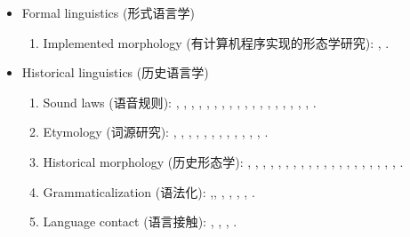 \documentclass[oneside,a4paper,11pt]{article}
\newcommand{\zh}[1]{{\cn #1}}
\newcommand{\lingua}[3]{#1 (\zh{#3})}
\begin{document}
\begin{itemize}
\begin{itemize}
\item \lingua{Formal linguistics}{Linguistique formelle}{形式语言学}
\begin{enumerate}
\item \lingua{Implemented morphology}{Morphologie implémentée}{有计算机程序实现的形态学研究}: \cite{walther14inv.canon}, \cite{walther14compactness}.
\end{enumerate}

\item \lingua{Historical linguistics}{Linguistique historique}{历史语言学}
\begin{enumerate}
\item \lingua{Sound laws}{Lois phonétiques}{语音规则}:  \cite{jacques00ywij}, \cite{jacques01dg}, \cite{jacques03dissimilation},   \cite{jacques04thimphu}, \cite{jacques06comparaison}, \cite{jacques09wazur}, \cite{jacques09e}, \cite{michaud10bonin}, \cite{jacques10ndr}, \cite{jacques.michaud11naish},   \cite{rg-gj12yod}, \cite{jacques13arapaho}, \cite{jacques13yod}, \cite{jacques14snom},   \cite{jacques14esquisse}, \cite{jacques14cone}, \cite{jacques16ebde}, \cite{jacques16tonogenesis}, \cite{jacques17pkiranti}.
\item  \lingua{Etymology}{Etymologie}{词源研究}:    \cite{jacques07naksatram}, \cite{jacques08debther}, \cite{jacques09zz}, \cite{jacques10imperial}, \cite{jacques11ngwemi}, \cite{jacques12bear},  \cite{jacques13vama},   \cite{jacques14esquisse}, \cite{jacques14honey}, \cite{jacques15sr}, \cite{jacques15cochon}, \cite{jacques17stau}, \cite{jacques17pkiranti}.
\item \lingua{Historical morphology}{Morphologie historique}{历史形态学}:  \cite{jacques03s.houzhui}, \cite{jacques06morpho}, \cite{jacques07chang},    \cite{jacques09tangutverb}, \cite{jacques10zos}, \cite{jacques11tangut.verb}, \cite{jacques12agreement}, \cite{jacques12internal}, \cite{jacques14antipassive},   \cite{jacques14esquisse}, \cite{jacques14cone}, \cite{jacques15derivational.khaling}, \cite{jacques15causative},  \cite{jacques15spontaneous}, \cite{jacques16ebde}, \cite{jacques16tonogenesis}, \cite{jacques16th}, \cite{jacques17stau}, \cite{jacques17num}, \cite{jacques17pkiranti}, \cite{jacques18directionality}.
\item \lingua{Grammaticalization}{Grammaticalisation}{语法化}: \cite{jacques12internal},\cite{jacques13harmonization}, \cite{jacques14antipassive}, \cite{jacques14ergative}, \cite{jacques16comparative},  \cite{jacques18generic}, \cite{jacques16ssuffixes}.
\item \lingua{Language contact}{Contact de langues}{语言接触}: \cite{antonov12kumush},   \cite{jacques12bear}, \cite{jacques14honey}, \cite{jacques19contact}.

\end{enumerate}
\end{itemize}
\end{itemize}
\end{document}
